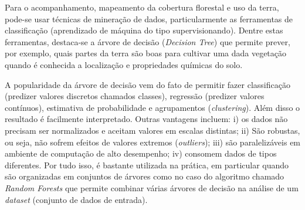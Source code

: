 \documentclass[12pt]{article}
\begin{document}
Para o acompanhamento, mapeamento da cobertura florestal e uso da terra, pode-se usar técnicas de mineração de dados, particularmente as ferramentas de classificação (aprendizado de máquina do tipo supervisionando).  Dentre estas ferramentas, destaca-se a árvore de decisão ({\it Decision Tree}) que permite prever, por exemplo, quais partes da terra são boas para cultivar uma dada vegetação quando é conhecida a localização e propriedades químicas do solo.

A popularidade da árvore de decisão vem do fato de permitir fazer classificação (predizer valores discretos chamados classes), regressão (predizer valores contínuos), estimativa de probabilidade e agrupamentos ({\it clustering}). Além disso o resultado é facilmente interpretado.
Outras vantagens incluem:  i) os dados não precisam ser normalizados e aceitam valores em escalas distintas; ii) São robustas, ou seja, não sofrem efeitos de valores extremos ({\it outliers}); iii) são paralelizáveis em ambiente de computação de alto desempenho; iv) consomem dados de tipos diferentes. Por tudo isso, é bastante utilizada na prática, em particular quando são organizadas em conjuntos de árvores como no caso do algoritmo chamado {\it Random Forests} que permite combinar várias árvores de decisão na análise de um {\it dataset} (conjunto de dados de entrada).
\end{document}

